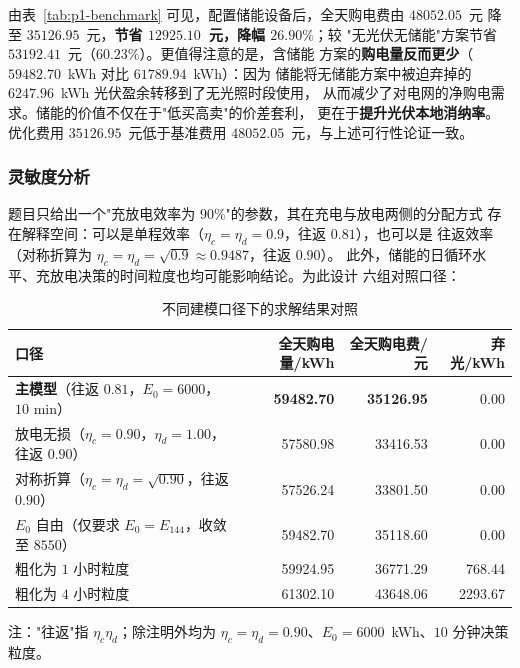 \documentclass[withoutpreface,bwprint]{cumcmthesis}
\begin{document}
由表~\ref{tab:p1-benchmark} 可见，配置储能设备后，全天购电费由 $48052.05$~元
降至 $35126.95$~元，\textbf{节省 $12925.10$~元，降幅 $26.90\%$}；较
"无光伏无储能"方案节省 $53192.41$~元（$60.23\%$）。更值得注意的是，含储能
方案的\textbf{购电量反而更少}（$59482.70$~kWh 对比 $61789.94$~kWh）：因为
储能将无储能方案中被迫弃掉的 $6247.96$~kWh 光伏盈余转移到了无光照时段使用，
从而减少了对电网的净购电需求。储能的价值不仅在于"低买高卖"的价差套利，
更在于\textbf{提升光伏本地消纳率}。优化费用 $35126.95$~元低于基准费用
$48052.05$~元，与上述可行性论证一致。

\subsubsection{灵敏度分析}

题目只给出一个"充放电效率为 $90\%$"的参数，其在充电与放电两侧的分配方式
存在解释空间：可以是单程效率（$\eta_c=\eta_d=0.9$，往返 $0.81$），也可以是
往返效率（对称折算为 $\eta_c=\eta_d=\sqrt{0.9}\approx0.9487$，往返 $0.90$）。
此外，储能的日循环水平、充放电决策的时间粒度也均可能影响结论。为此设计
六组对照口径：

\begin{table}[htbp]
  \centering
  \caption{不同建模口径下的求解结果对照}
  \label{tab:p1-sensitivity}
  \footnotesize
  \begin{tabular}{lrrr}
    \toprule
    口径 & 全天购电量/kWh & 全天购电费/元 & 弃光/kWh \\
    \midrule
    \textbf{主模型}（往返 $0.81$，$E_0=6000$，$10$ min）
      & \textbf{59482.70} & \textbf{35126.95} & 0.00 \\
    放电无损（$\eta_c=0.90$，$\eta_d=1.00$，往返 $0.90$）
      & 57580.98 & 33416.53 & 0.00 \\
    对称折算（$\eta_c=\eta_d=\sqrt{0.90}$，往返 $0.90$）
      & 57526.24 & 33801.50 & 0.00 \\
    $E_0$ 自由（仅要求 $E_0=E_{144}$，收敛至 $8550$）
      & 59482.70 & 35118.60 & 0.00 \\
    粗化为 $1$ 小时粒度
      & 59924.95 & 36771.29 & 768.44 \\
    粗化为 $4$ 小时粒度
      & 61302.10 & 43648.06 & 2293.67 \\
    \bottomrule
  \end{tabular}
  \par\vspace{2pt}
  \begin{minipage}{.92\textwidth}
    \footnotesize 注："往返"指 $\eta_c\eta_d$；除注明外均为
    $\eta_c=\eta_d=0.90$、$E_0=6000$~kWh、$10$ 分钟决策粒度。
  \end{minipage}
\end{table}
\end{document}
